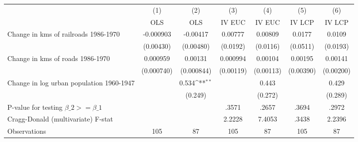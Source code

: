 {
\def\sym#1{\ifmmode^{#1}\else\(^{#1}\)\fi}
\begin{tabular}{l*{6}{c}}
\hline\hline
                &\multicolumn{1}{c}{(1)}&\multicolumn{1}{c}{(2)}&\multicolumn{1}{c}{(3)}&\multicolumn{1}{c}{(4)}&\multicolumn{1}{c}{(5)}&\multicolumn{1}{c}{(6)}\\
                &\multicolumn{1}{c}{OLS}&\multicolumn{1}{c}{OLS}&\multicolumn{1}{c}{IV EUC}&\multicolumn{1}{c}{IV EUC}&\multicolumn{1}{c}{IV LCP}&\multicolumn{1}{c}{IV LCP}\\
\hline
Change in kms of railroads 1986-1970&-0.000903         & -0.00417         &  0.00777         &  0.00809         &   0.0177         &   0.0109         \\
                &(0.00430)         &(0.00480)         & (0.0192)         & (0.0116)         & (0.0511)         & (0.0193)         \\
[1em]
Change in kms of roads 1986-1970& 0.000959         &  0.00131         & 0.000994         &  0.00104         &  0.00195         &  0.00141         \\
                &(0.000740)         &(0.000844)         &(0.00119)         &(0.00113)         &(0.00390)         &(0.00200)         \\
[1em]
Change in log urban population 1960-1947&                  &    0.534\sym{**} &                  &    0.443         &                  &    0.429         \\
                &                  &  (0.249)         &                  &  (0.272)         &                  &  (0.289)         \\
\hline
P-value for testing $\beta\_{2} >= \beta\_{1}$&                  &                  &    .3571         &    .2657         &    .3694         &    .2972         \\
Cragg-Donald (multivariate) F-stat&                  &                  &   2.2228         &   7.4053         &    .3438         &   2.2396         \\
Observations    &      105         &       87         &      105         &       87         &      105         &       87         \\
\hline\hline
\end{tabular}
}
